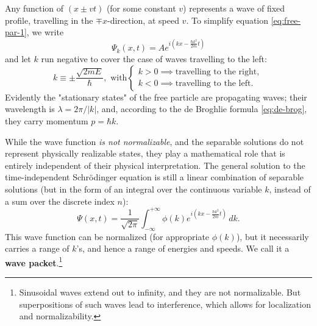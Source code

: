 \documentclass{article}
\begin{document}
Any function of $(x \pm vt)$ (for some constant $v$) represents a wave of fixed
profile, travelling in the $\mp x$-direction, at speed $v$. To simplify
equation \eqref{eq:free-par-1}, we write
\begin{equation} \label{eq:free-par-2}
  \Psi_k(x, t) = Ae^{i(kx - \frac{\hbar k^2}{2m}t)}
\end{equation}
and let $k$ run negative to cover the case of waves travelling to the left:
\begin{equation} \label{eq:free-par-k}
  k \equiv \pm\frac{\sqrt{2mE}}{\hbar},
  \text{ with}
  \begin{cases}
    k > 0 \implies \text{travelling to the right}, \\
    k < 0 \implies \text{travelling to the left}.
  \end{cases}
\end{equation}
Evidently the "stationary states" of the free particle are propagating waves;
their wavelength is $\lambda = 2\pi/|k|$, and, according to the de Broghlie
formula \eqref{eq:de-brog}, they carry momentum $p = \hbar k$.

While the wave function \emph{is not normalizable}, and the separable solutions
do not represent physically realizable states, they play a mathematical role
that is entirely independent of their physical interpretation. The general
solution to the time-independent Schr\"{o}dinger equation is still a linear
combination of separable solutions (but in the form of an integral over the
continuous variable $k$, instead of a sum over the discrete index $n$):
\begin{equation} \label{eq:free-par-psi}
  \boxed{
    \Psi(x, t)
    = \frac{1}{\sqrt{2\pi}}\int_{-\infty}^{+\infty}
      \phi(k)e^{i(kx - \frac{\hbar k^2}{2m}t)}
    \,dk.
  }
\end{equation}
This wave function can be normalized (for appropriate $\phi(k)$), but it
necessarily carries a range of $k$'s, and hence a range of energies and speeds.
We call it a \textbf{wave packet}.\footnote{Sinusoidal waves extend out to
infinity, and they are not normalizable. But superpositions of such waves lead
to interference, which allows for localization and normalizability.}
\end{document}
